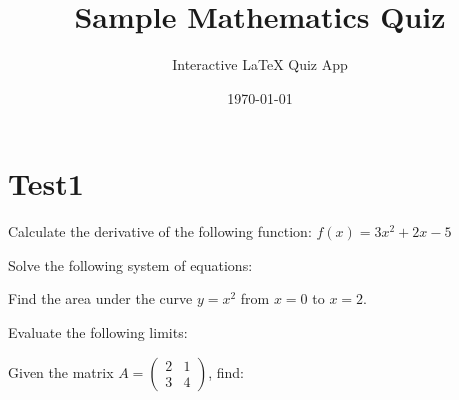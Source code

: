 \documentclass[12pt]{exam}
\title{Sample Mathematics Quiz}
\author{Interactive LaTeX Quiz App}
\date{\today}
\begin{document}
\maketitle


\section{Test1}
\begin{questions}

\question Calculate the derivative of the following function: $f(x) = 3x^2 + 2x - 5$

\question Solve the following system of equations:

\question Find the area under the curve $y = x^2$ from $x = 0$ to $x = 2$.

\question Evaluate the following limits:

\question Given the matrix $A = \begin{pmatrix} 2 & 1 \\ 3 & 4 \end{pmatrix}$, find:


\end{questions}
\end{document}
